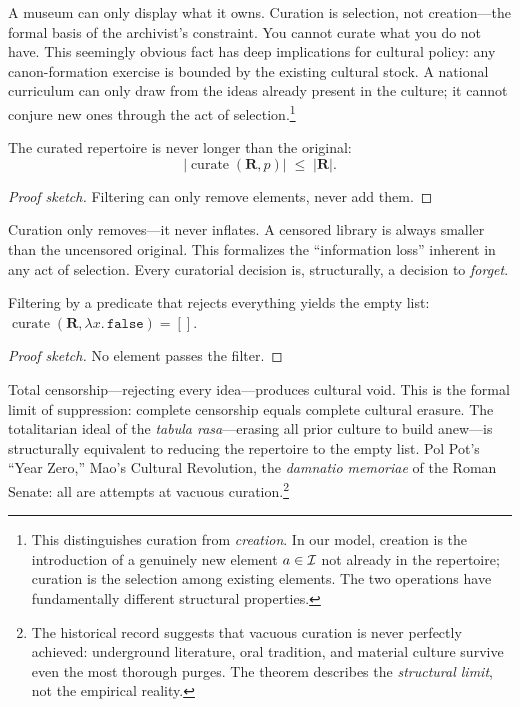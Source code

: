 A museum can only display what it owns.  Curation is selection, not
creation---the formal basis of the archivist's constraint.  You cannot
curate what you do not have.  This seemingly obvious fact has deep
implications for cultural policy: any canon-formation exercise is bounded
by the existing cultural stock.  A national curriculum can only draw from
the ideas already present in the culture; it cannot conjure new ones through
the act of selection.\footnote{This distinguishes curation from
\emph{creation}.  In our model, creation is the introduction of a genuinely
new element $a \in \mathcal{I}$ not already in the repertoire; curation is the
selection among existing elements.  The two operations have fundamentally
different structural properties.}

\begin{theorem}
\label{thm:curate-length}
The curated repertoire is never longer than the original:
\[
  |\operatorname{curate}(\mathbf{R}, p)| \;\le\; |\mathbf{R}|.
\]
\end{theorem}

\begin{proof}[Proof sketch]
Filtering can only remove elements, never add them.
\end{proof}

Curation only removes---it never inflates.  A censored library is always
smaller than the uncensored original.  This formalizes the ``information
loss'' inherent in any act of selection.  Every curatorial decision is,
structurally, a decision to \emph{forget}.

\begin{theorem}
\label{thm:vacuous-curate}
Filtering by a predicate that rejects everything yields the empty list:
$\operatorname{curate}(\mathbf{R}, \lambda x.\, \texttt{false}) = []$.
\end{theorem}

\begin{proof}[Proof sketch]
No element passes the filter.
\end{proof}

Total censorship---rejecting every idea---produces cultural void.  This is
the formal limit of suppression: complete censorship equals complete cultural
erasure.  The totalitarian ideal of the \emph{tabula rasa}---erasing all
prior culture to build anew---is structurally equivalent to reducing the
repertoire to the empty list.  Pol Pot's ``Year Zero,'' Mao's Cultural
Revolution, the \emph{damnatio memoriae} of the Roman Senate: all are
attempts at vacuous curation.\footnote{The historical record suggests that
vacuous curation is never perfectly achieved: underground literature,
oral tradition, and material culture survive even the most thorough
purges.  The theorem describes the \emph{structural limit}, not the
empirical reality.}

